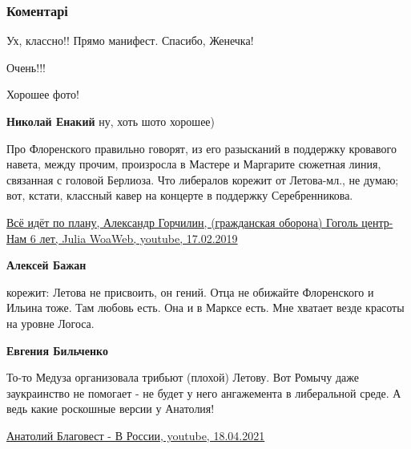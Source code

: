  
 
 
 
 
\subsubsection{Коментарі}
\label{sec:18_10_2021.fb.bilchenko_evgenia.6.durochka.cmt}

\begin{itemize} %
Ух, классно!! Прямо манифест. Спасибо, Женечка!

Очень!!!

Хорошее фото!

\begin{itemize} %
\textbf{Николай Енакий} ну, хоть шото хорошее)
\end{itemize} %


Про Флоренского правильно говорят, из его разысканий в поддержку кровавого
навета, между прочим, произросла в Мастере и Маргарите сюжетная линия,
связанная с головой Берлиоза. Что либералов корежит от Летова-мл., не думаю;
вот, кстати, классный кавер на концерте в поддержку Серебренникова.

\href{https://www.youtube.com/watch?v=IV6LmZQdfaw}{%
Всё идёт по плану, Александр Горчилин, (гражданская оборона) Гоголь центр-Нам 6 лет, %
Julia WoaWeb, youtube, 17.02.2019%
}

\begin{itemize} %
\textbf{Алексей Бажан} 

корежит: Летова не присвоить, он гений. Отца не обижайте Флоренского и Ильина
тоже. Там любовь есть. Она и в Марксе есть. Мне хватает везде красоты на уровне
Логоса.

\textbf{Евгения Бильченко} 

То-то Медуза организовала трибьют (плохой) Летову. Вот Ромычу даже заукраинство
не помогает - не будет у него ангажемента в либеральной среде. А ведь какие
роскошные версии у Анатолия! 

\href{https://www.youtube.com/watch?v=cfJXP8IIJA0}{%
Анатолий Благовест - В России, youtube, 18.04.2021%
}


\end{itemize}
\end{itemize}

